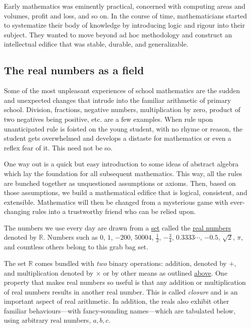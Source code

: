 \documentclass[
  a4paper,
]{article}
\begin{document}
Early mathematics was eminently practical, concerned with computing
areas and volumes, profit and loss, and so on. In the course of time,
mathematicians started to systematize their body of knowledge by
introducing logic and rigour into their subject. They wanted to move
beyond ad hoc methodology and construct an intellectual edifice that was
stable, durable, and generalizable.

\hypertarget{the-real-numbers-as-a-field}{%
\subsection{The real numbers as a
field}\label{the-real-numbers-as-a-field}}

Some of the most unpleasant experiences of school mathematics are the
sudden and unexpected changes that intrude into the familiar arithmetic
of primary school. Division, fractions, negative numbers, multiplication
by zero, product of two negatives being positive, etc. are a few
examples. When rule upon unanticipated rule is foisted on the young
student, with no rhyme or reason, the student gets overwhelmed and
develops a distaste for mathematics or even a reflex fear of it. This
need not be so.

One way out is a quick but easy introduction to some ideas of abstract
algebra which lay the foundation for all subsequent mathematics. This
way, all the rules are bunched together as unquestioned assumptions or
axioms. Then, based on those assumptions, we build a mathematical
edifice that is logical, consistent, and extensible. Mathematics will
then be changed from a mysterious game with ever-changing rules into a
trustworthy friend who can be relied upon.

The numbers we use every day are drawn from a
\href{https://www.cuemath.com/algebra/sets/}{set} called the
\href{https://mathworld.wolfram.com/RealNumber.html}{real numbers}
denoted by \(\mathbb{R}\). Numbers such as \(0\), \(1\), \(-200\),
\(50004\), \(\frac{1}{2}\), \(-\frac{3}{4}\), \(0.3333\cdots\),
\(-0.5\), \(\sqrt{2}\), \(\pi\), and countless others belong to this
grab bag set.

The set \(\mathbb{R}\) comes bundled with \emph{two} binary operations:
addition, denoted by \(+\), and multiplication denoted by \(\times\) or
by other means as outlined
\protect\hyperlink{symbols-for-multiplication-across-time-and-need}{above}.
One property that makes real numbers so useful is that any addition or
multiplication of real numbers results in another real number. This is
called \emph{closure} and is an important aspect of real arithmetic. In
addition, the reals also exhibit other familiar behaviours---with
fancy-sounding names---which are tabulated below, using arbitrary real
numbers, \(a, b, c\).
\end{document}
